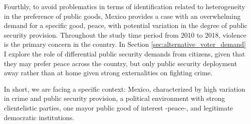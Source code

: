 \documentclass[12pt]{amsart}
\numberwithin{equation}{section}
\theoremstyle{definition}
\theoremstyle{definition}
\theoremstyle{definition}
\begin{document}
\begin{appendix}
 
Fourthly, to avoid problematics in terms of identification related to heterogeneity in the preference of public goods, Mexico provides a case with an  overwhelming demand for a specific good, peace, with potential variation in the degree of public security provision. Throughout the study time period from 2010 to 2018, violence is the primary concern in the country. In Section \ref{sec:alternative_voter_demand} I explore the role of differential public security demands from citizens, given that they may prefer peace across the country, but only public security deployment away rather than at home given strong externalities on fighting crime.   
 
In short, we are facing a specific context: Mexico, characterized by high variation in crime and public security provision, a political environment with strong clientelistic parties, one mayor public good of interest -peace-, and legitimate democratic institutions.  

\clearpage


\end{appendix}
\end{document}
